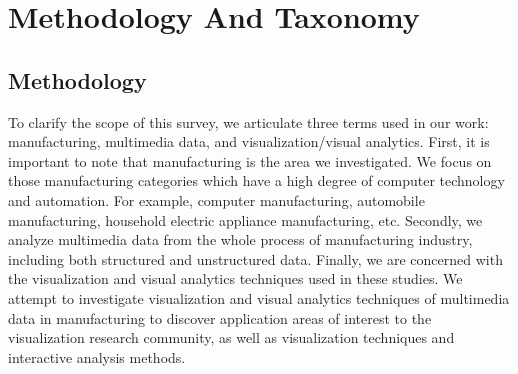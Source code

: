 \documentclass[a4paper,fleqn]{cas-dc}
\begin{document}
 
\section{Methodology And Taxonomy}
\subsection{Methodology}
To clarify the scope of this survey, we articulate three terms used in our work: manufacturing, multimedia data, and visualization/visual analytics.
First, it is important to note that manufacturing is the area we investigated.
We focus on those manufacturing categories which have a high degree of computer technology and automation.
For example, computer manufacturing, automobile manufacturing, household electric appliance manufacturing, etc.
Secondly, we analyze multimedia data from the whole process of manufacturing industry, including both structured and unstructured data. 
Finally, we are concerned with the visualization and visual analytics techniques used in these studies.
We attempt to investigate visualization and visual analytics techniques of multimedia data in manufacturing to discover application areas of interest to the visualization research community, as well as visualization techniques and interactive analysis methods.
\end{document}
